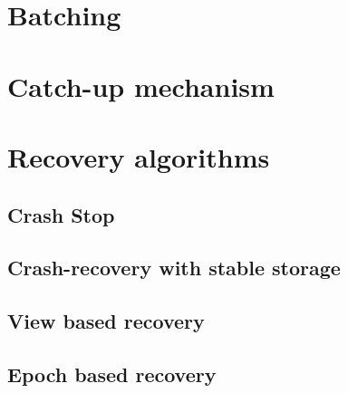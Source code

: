\section{Batching}

\section{Catch-up mechanism}

\section{Recovery algorithms}

\subsection{Crash Stop}

\subsection{Crash-recovery with stable storage}

\subsection{View based recovery}

\subsection{Epoch based recovery}


